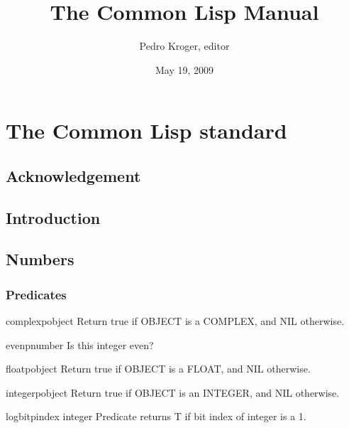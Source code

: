 \documentclass[10pt,english]{book}
\title{The Common Lisp Manual}
\author{Pedro Kroger, editor}
\date{May 19, 2009}
\begin{document}
\frontmatter

\maketitle
\tableofcontents

\mainmatter

\part{The Common Lisp standard}
\label{part:common-lisp-standard}


\chapter*{Acknowledgement}
\label{cha:acknowledgement}



\chapter{Introduction}



\chapter{Numbers}

\section{Predicates}
\label{sec:number-predicates}

\begin{function}{complexp}{object}
  Return true if OBJECT is a COMPLEX, and NIL otherwise.
\end{function}

\begin{function}{evenp}{number}
  Is this integer even?
\end{function}

\begin{function}{floatp}{object}
  Return true if OBJECT is a FLOAT, and NIL otherwise.
\end{function}

\begin{function}{integerp}{object}
  Return true if OBJECT is an INTEGER, and NIL otherwise.
\end{function}

\begin{function}{logbitp}{index integer}
  Predicate returns T if bit index of integer is a 1.
\end{function}
\end{document}
